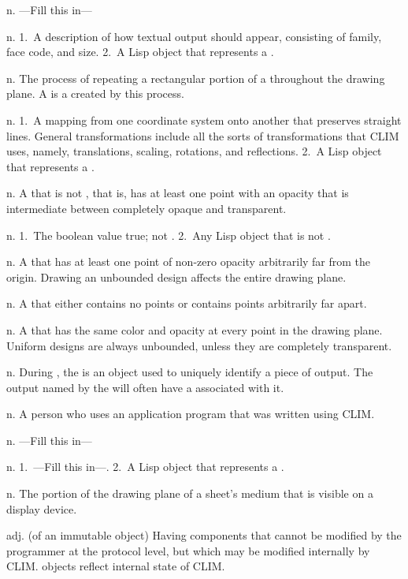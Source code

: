 \begin{description}
 {n.} {---Fill this in---}

 {n.} {1.~A description of how textual output should
appear, consisting of family, face code, and size.  2.~A Lisp object that
represents a .}

 {n.} {The process of repeating a rectangular portion of
a  throughout the drawing plane.  A  is a 
created by this process.}

 {n.} {1.~A mapping from one coordinate system
onto another that preserves straight lines.  General transformations include all
the sorts of transformations that CLIM uses, namely, translations, scaling,
rotations, and reflections.  2.~A Lisp object that represents a
.}

 {n.} {A  that is not
, that is, has at least one point with an opacity that is
intermediate between completely opaque and transparent.}

 {n.} {1.~The boolean value true; not .  2.~Any
Lisp object that is not .}

 {n.} {A  that has at least one
point of non-zero opacity arbitrarily far from the origin.  Drawing an unbounded
design affects the entire drawing plane.}

 {n.} {A  that either contains no
points or contains points arbitrarily far apart.}

 {n.} {A  that has the same color
and opacity at every point in the drawing plane.  Uniform designs are always
unbounded, unless they are completely transparent.}

 {n.} {During , the
 is an object used to uniquely identify a piece of output.  The
output named by the  will often have a 
associated with it.}

 {n.} {A person who uses an application program that was
written using CLIM.}

 {n.} {---Fill this in---}

 {n.} {1.~---Fill this in---.  2.~A Lisp object that
represents a .}

 {n.} {The portion of the drawing plane of a sheet's
medium that is visible on a display device.}

 {adj.} {(of an immutable object) Having components
that cannot be modified by the programmer at the protocol level, but which may
be modified internally by CLIM.   objects reflect internal state
of CLIM.}

\end{description}
